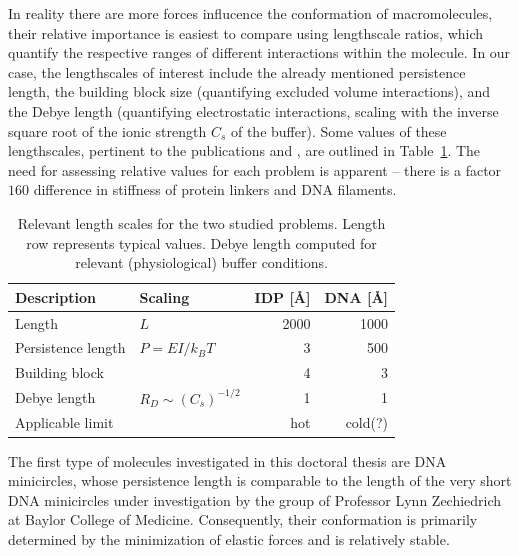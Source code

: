 \documentclass{doctoral}
\begin{document}
In reality there are more forces influcence the conformation of macromolecules, their relative importance is easiest to compare using lengthscale ratios, which quantify the respective ranges of different interactions within the molecule.
In our case, the lengthscales of interest include the already mentioned persistence length, the building block size (quantifying excluded volume interactions), and the Debye length (quantifying electrostatic interactions, scaling with the inverse square root of the ionic strength $C_s$ of the buffer).
Some values of these lengthscales, pertinent to the publications \cite{Waszkiewicz_2023_dna} and \cite{Waszkiewicz_2024_mda}, are outlined in Table~\ref{tab:lengthscales}.
The need for assessing relative values for each problem is apparent -- there is a factor $160$ difference in stiffness of protein linkers and DNA filaments.

\begin{table}[htbp]
    \centering
    \begin{tabular}{llrr}
        \toprule
        \textbf{Description} &
        \textbf{Scaling}     &
        \textbf{IDP [\AA]}   &
        \textbf{DNA [\AA]}                                              \\
        \midrule
        Length               & $L$                     & 2000 & 1000    \\
        Persistence length   & $P = EI / k_B T$        & 3    & 500     \\
        Building block       &                         & 4    & 3       \\
        Debye length         & $R_D \sim (C_s)^{-1/2}$ & 1    & 1       \\
        \midrule
        Applicable limit     &                         & hot  & cold(?) \\
        \bottomrule
    \end{tabular}
    \caption{Relevant length scales for the two studied problems.
        Length row represents typical values.
        Debye length computed for relevant (physiological) buffer conditions.
    } \label{tab:lengthscales}
\end{table}

The first type of molecules investigated in this doctoral thesis are DNA minicircles, whose persistence length is comparable to the length of the very short DNA minicircles under investigation by the group of Professor Lynn Zechiedrich at Baylor College of Medicine.
Consequently, their conformation is primarily determined by the minimization of elastic forces and is relatively stable.
\end{document}
